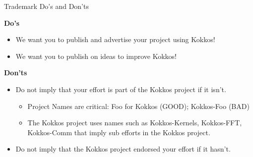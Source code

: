 \begin{frame}[fragile]{Trademark Do's and Don'ts}

\textbf{Do's}

\begin{itemize}
\item{We want you to publish and advertise your project using Kokkos!}
\item{We want you to publish on ideas to improve Kokkos!}
\end{itemize}

\vspace{1cm}
\textbf{Don'ts}

\begin{itemize}
\item{Do not imply that your effort is part of the Kokkos project if it isn't.}
\begin{itemize}
\item{Project Names are critical: Foo for Kokkos (GOOD); Kokkos-Foo (BAD)}
\item{The Kokkos project uses names such as Kokkos-Kernels, Kokkos-FFT, Kokkos-Comm that imply sub efforts in the Kokkos project.}
\end{itemize}
\item{Do not imply that the Kokkos project endorsed your effort if it hasn't.}
\end{itemize}

\end{frame}


